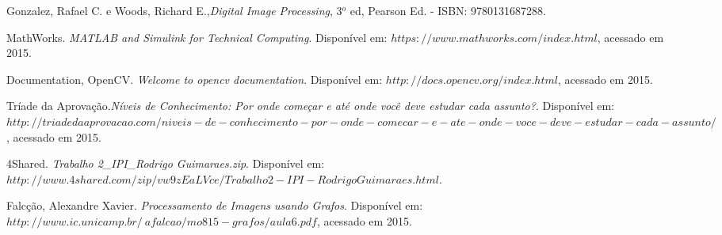 \documentclass[conference]{Trabalho_2}
\begin{document}

%
%
%
\begin{thebibliography}{1}

Gonzalez, Rafael C. e Woods, Richard E.,\emph{Digital Image Processing}, 3$^o$ ed,
Pearson Ed. - ISBN: 9780131687288. 

MathWorks. \emph{MATLAB and Simulink for Technical Computing}. Dispon\'ivel em: $https://www.mathworks.com/index.html$, acessado em 2015.

Documentation, OpenCV. \emph{Welcome to opencv documentation}. Dispon\'ivel em: $http://docs.opencv.org/index.html$, acessado em 2015.

Tr\'iade da Aprova\c{c}\~ao.\emph{N\'iveis de Conhecimento: Por onde come\c{c}ar e at\'e onde voc\^e deve estudar cada assunto?}. Dispon\'ivel em:
$http://triadedaaprovacao.com/niveis-de-conhecimento-por-onde-comecar-e-ate-onde-voce-deve-estudar-cada-assunto/$, acessado em 2015.

4Shared. \emph{Trabalho 2\_IPI\_Rodrigo Guimaraes.zip}. Dispon\'ivel em:
$http://www.4shared.com/zip/vw9zEaLVce/Trabalho2-IPI-RodrigoGuimaraes.html$.

Falc\c{c}\~ao, Alexandre Xavier. \emph{Processamento de Imagens usando Grafos}. Dispon\'ivel em: $http://www.ic.unicamp.br/~afalcao/mo815-grafos/aula6.pdf$, acessado em 2015.





\end{thebibliography}




\end{document}
